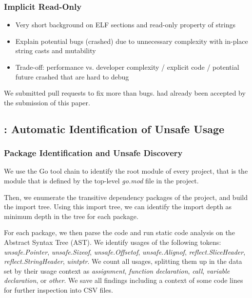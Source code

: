 \subsubsection*{Implicit Read-Only}

\begin{itemize}
    \item Very short background on ELF sections and read-only property of strings
    \item Explain potential bugs (crashed) due to unnecessary complexity with in-place string casts and mutability
    \item Trade-off: performance vs. developer complexity / explicit code / potential future crashed that are hard to debug
\end{itemize}

We submitted \numberPRs{} pull requests to fix more than \numberBugsFixed{} bugs. \numberPRsMerged{} had already been accepted by the submission of this paper.


\subsection{\toolUsage{}: Automatic Identification of Unsafe Usage}

\subsubsection*{Package Identification and Unsafe Discovery}

We use the Go tool chain to identify the root module of every project, that is the module that is defined by the top-level \textit{go.mod} file in the project.

Then, we enumerate the transitive dependency packages of the project, and build the import tree. Using this import tree, we can identify the import depth as minimum depth in the tree for each package.

For each package, we then parse the code and run static code analysis on the Abstract Syntax Tree (AST). We identify usages of the following \unsafe{} tokens: \textit{unsafe.Pointer}, \textit{unsafe.Sizeof}, \textit{unsafe.Offsetof}, \textit{unsafe.Alignof}, \textit{reflect.SliceHeader}, \textit{reflect.StringHeader}, \textit{uintptr}.
We count all usages, splitting them up in the data set by their usage context as \textit{assignment}, \textit{function declaration}, \textit{call}, \textit{variable declaration}, or \textit{other}.
We save all findings including a context of some code lines for further inspection into CSV files.

